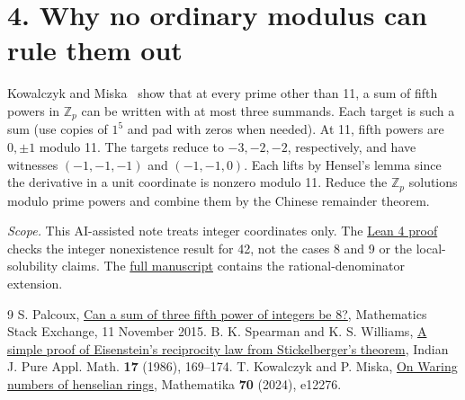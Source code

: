 \documentclass[10pt]{article}
\newcommand{\Z}{\mathbb Z}
\begin{document}
\section*{4. Why no ordinary modulus can rule them out}
Kowalczyk and Miska~\cite[Table~3]{km} show that at every prime other
than 11, a sum of fifth powers in $\Z_p$ can be written with at most
three summands. Each target is such a sum (use copies of $1^5$ and pad
with zeros when needed). At 11, fifth powers are $0,\pm1$ modulo 11.
The targets reduce to $-3,-2,-2$, respectively, and have witnesses
$(-1,-1,-1)$ and $(-1,-1,0)$. Each lifts by Hensel's lemma since the
derivative in a unit coordinate is nonzero modulo 11. Reduce the
$\Z_p$ solutions modulo prime powers and combine them by the Chinese
remainder theorem.

\small
\textit{Scope.} This AI-assisted note treats integer coordinates only.
The \href{https://github.com/paulnord/fifth42/tree/main/docs/verification/complete}{Lean 4 proof} checks the integer nonexistence result
for 42, not the cases 8 and 9 or the local-solubility claims.
The \href{https://github.com/paulnord/fifth42/blob/494c8a3a85ecce84505fd47aabadc9465303393c/docs/fifth42.pdf}{full manuscript}
contains the rational-denominator extension.

\begin{thebibliography}{9}
\setlength{\itemsep}{0pt}
 S. Palcoux, \href{https://math.stackexchange.com/questions/1524797/can-a-sum-of-three-fifth-power-of-integers-be-8}{Can a sum of three fifth power of integers be 8?}, Mathematics Stack Exchange, 11 November 2015.
 B. K. Spearman and K. S. Williams, \href{https://people.math.carleton.ca/~williams/papers/pdf/142.pdf}{A simple proof of Eisenstein's reciprocity law from Stickelberger's theorem}, Indian J. Pure Appl. Math. \textbf{17} (1986), 169--174.
 T. Kowalczyk and P. Miska, \href{https://doi.org/10.1112/mtk.12276}{On Waring numbers of henselian rings}, Mathematika \textbf{70} (2024), e12276.
\end{thebibliography}
\end{document}
